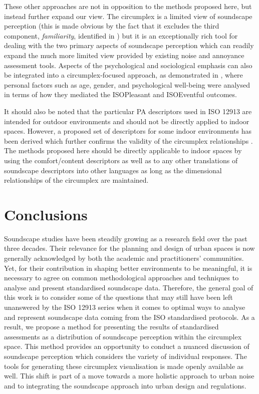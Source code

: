 These other approaches are not in opposition to the methods proposed here, but instead further expand our view. The circumplex is a limited view of soundscape perception (this is made obvious by the fact that it excludes the third component, \emph{familiarity}, identified in \citet{Axelsson2010principal}) but it is an exceptionally rich tool for dealing with the two primary aspects of soundscape perception which can readily expand the much more limited view provided by existing noise and annoyance assessment tools. Aspects of the psychological and sociological emphasis can also be integrated into a circumplex-focused approach, as demonstrated in \citet{Erfanian2021Psychological}, where personal factors such as age, gender, and psychological well-being were analysed in terms of how they mediated the ISOPleasant and ISOEventful outcomes.

It should also be noted that the particular PA descriptors used in ISO 12913 are intended for outdoor environments and should not be directly applied to indoor spaces. However, a proposed set of descriptors for some indoor environments has been derived which further confirms the validity of the circumplex relationships \citep{Torresin2020Indoor}. The methods proposed here should be directly applicable to indoor spaces by using the comfort/content descriptors as well as to any other translations of soundscape descriptors into other languages \citep{Aletta2020Soundscape} as long as the dimensional relationships of the circumplex are maintained.


\section{Conclusions}
Soundscape studies have been steadily growing as a research field over the past three decades. Their relevance for the planning and design of urban spaces is now generally acknowledged by both the academic and practitioners' communities. Yet, for their contribution in shaping better environments to be meaningful, it is necessary to agree on common methodological approaches and techniques to analyse and present standardised soundscape data. Therefore, the general goal of this work is to consider some of the questions that may still have been left unanswered by the ISO 12913 series when it comes to optimal ways to analyse and represent soundscape data coming from the ISO standardised protocols. As a result, we propose a method for presenting the results of standardised
assessments as a distribution of soundscape perception within the circumplex space. This method provides an opportunity to conduct a nuanced discussion of soundscape perception which considers the variety of individual responses. The tools for generating these circumplex visualisation is made openly available as well. This shift is part of a move towards a more holistic approach to urban noise and to integrating the soundscape approach into urban design and regulations.


